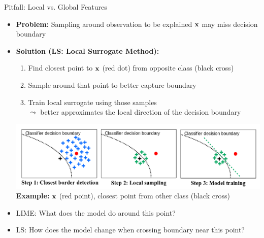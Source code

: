 \documentclass[10pt,compress,t,notes=noshow, xcolor=table]{beamer}
\begin{document}
\begin{frame}{Pitfall: Local vs. Global Features }
		\begin{itemize}
             \item \textbf{Problem:} Sampling around observation to be explained $\mathbf{x}$ may miss decision boundary
		\item \textbf{Solution (LS: Local Surrogate Method):}
  \begin{enumerate}

    \item Find closest point to $\mathbf{x}$ (red dot) from opposite class (black cross)
    \item Sample around that point to better capture boundary
    \item Train local surrogate using those samples\\
		$\leadsto$ better approximates the local direction of the decision boundary 
    \end{enumerate}
		\begin{center}
		\includegraphics[width=\linewidth]{figure/laugel_method}
		\scriptsize{\textbf{Example:} $\mathbf{x}$ (red point), closest point from other class (black cross)}
		\end{center}

    \item LIME: What does the model do around this point?
    \item LS: How does the model change when crossing boundary near this point?
	\end{itemize}


\end{frame}
\end{document}
